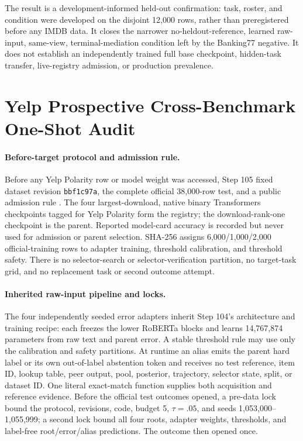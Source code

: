 The result is a development-informed held-out confirmation: task, roster, and condition were developed on the disjoint 12,000 rows, rather than preregistered before any IMDB data. It closes the narrower no-heldout-reference, learned raw-input, same-view, terminal-mediation condition left by the Banking77 negative. It does not establish an independently trained full base checkpoint, hidden-task transfer, live-registry admission, or production prevalence.

\section{Yelp Prospective Cross-Benchmark One-Shot Audit}
\label{app:step105}

\paragraph{Before-target protocol and admission rule.}
Before any Yelp Polarity row or model weight was accessed, Step 105 fixed dataset revision \texttt{bbf1c97a}, the complete official 38,000-row test, and a public admission rule \citep{zhang2015character}. The four largest-download, native binary Transformers checkpoints tagged for Yelp Polarity form the registry; the download-rank-one checkpoint is the parent. Reported model-card accuracy is recorded but never used for admission or parent selection. SHA-256 assigns 6,000/1,000/2,000 official-training rows to adapter training, threshold calibration, and threshold safety. There is no selector-search or selector-verification partition, no target-task grid, and no replacement task or second outcome attempt.

\paragraph{Inherited raw-input pipeline and locks.}
The four independently seeded error adapters inherit Step 104's architecture and training recipe: each freezes the lower RoBERTa blocks and learns 14,767,874 parameters from raw text and parent error. A stable threshold rule may use only the calibration and safety partitions. At runtime an alias emits the parent hard label or its own out-of-label abstention token and receives no test reference, item ID, lookup table, peer output, pool, posterior, trajectory, selector state, split, or dataset ID. One literal exact-match function supplies both acquisition and reference evidence. Before the official test outcomes opened, a pre-data lock bound the protocol, revisions, code, budget 5, $\tau=.05$, and seeds 1,053,000--1,055,999; a second lock bound all four roots, adapter weights, thresholds, and label-free root/error/alias predictions. The outcome then opened once.

